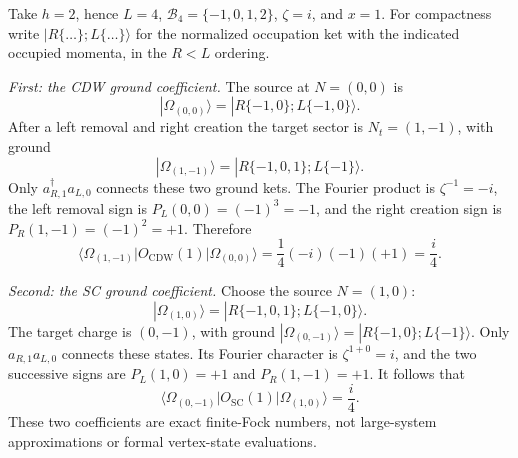 \begin{example}
\label{ex:ch20-four-site}
Take \(h=2\), hence \(L=4\),
\(\mathcal B_4=\{-1,0,1,2\}\),
\(\zeta=i\), and \(x=1\).  For compactness write
\(|R\{\ldots\};L\{\ldots\}\rangle\) for the normalized occupation
ket with the indicated occupied momenta, in the \(R<L\) ordering.

\emph{First: the CDW ground coefficient.}
The source at \(N=(0,0)\) is
\[
 |\Omega_{(0,0)}\rangle
  =|R\{-1,0\};L\{-1,0\}\rangle.
\]
After a left removal and right creation the target sector is
\(N_t=(1,-1)\), with ground
\[
 |\Omega_{(1,-1)}\rangle
  =|R\{-1,0,1\};L\{-1\}\rangle.
\]
Only \(a_{R,1}^{\dagger}a_{L,0}\) connects these two ground kets.
The Fourier product is \(\zeta^{-1}= -i\), the left removal sign is
\(P_L(0,0)=(-1)^3=-1\), and the right creation sign is
\(P_R(1,-1)=(-1)^2=+1\).  Therefore
\begin{equation}
 \langle\Omega_{(1,-1)}|
    O_{\mathrm{CDW}}(1)|\Omega_{(0,0)}\rangle
 =\frac14(-i)(-1)(+1)=\frac{i}{4}.
 \label{eq:ch20-four-cdw}
\end{equation}

\emph{Second: the SC ground coefficient.}
Choose the source \(N=(1,0)\):
\[
 |\Omega_{(1,0)}\rangle
   =|R\{-1,0,1\};L\{-1,0\}\rangle.
\]
The target charge is \((0,-1)\), with ground
\( |\Omega_{(0,-1)}\rangle
   =|R\{-1,0\};L\{-1\}\rangle\).
Only \(a_{R,1}a_{L,0}\) connects these states.  Its Fourier
character is \(\zeta^{1+0}=i\), and the two successive signs are
\(P_L(1,0)=+1\) and \(P_R(1,-1)=+1\).  It follows that
\begin{equation}
 \langle\Omega_{(0,-1)}|
    O_{\mathrm{SC}}(1)|\Omega_{(1,0)}\rangle
 =\frac{i}{4}.
 \label{eq:ch20-four-sc}
\end{equation}
These two coefficients are exact finite-Fock numbers, not
large-system approximations or formal vertex-state evaluations.


\end{example}
